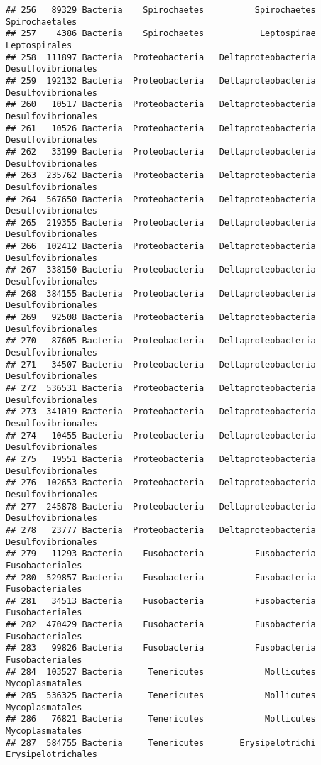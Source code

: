 \documentclass[
]{article}
\begin{document}
\begin{verbatim}
## 256   89329 Bacteria    Spirochaetes          Spirochaetes      Spirochaetales
## 257    4386 Bacteria    Spirochaetes           Leptospirae       Leptospirales
## 258  111897 Bacteria  Proteobacteria   Deltaproteobacteria  Desulfovibrionales
## 259  192132 Bacteria  Proteobacteria   Deltaproteobacteria  Desulfovibrionales
## 260   10517 Bacteria  Proteobacteria   Deltaproteobacteria  Desulfovibrionales
## 261   10526 Bacteria  Proteobacteria   Deltaproteobacteria  Desulfovibrionales
## 262   33199 Bacteria  Proteobacteria   Deltaproteobacteria  Desulfovibrionales
## 263  235762 Bacteria  Proteobacteria   Deltaproteobacteria  Desulfovibrionales
## 264  567650 Bacteria  Proteobacteria   Deltaproteobacteria  Desulfovibrionales
## 265  219355 Bacteria  Proteobacteria   Deltaproteobacteria  Desulfovibrionales
## 266  102412 Bacteria  Proteobacteria   Deltaproteobacteria  Desulfovibrionales
## 267  338150 Bacteria  Proteobacteria   Deltaproteobacteria  Desulfovibrionales
## 268  384155 Bacteria  Proteobacteria   Deltaproteobacteria  Desulfovibrionales
## 269   92508 Bacteria  Proteobacteria   Deltaproteobacteria  Desulfovibrionales
## 270   87605 Bacteria  Proteobacteria   Deltaproteobacteria  Desulfovibrionales
## 271   34507 Bacteria  Proteobacteria   Deltaproteobacteria  Desulfovibrionales
## 272  536531 Bacteria  Proteobacteria   Deltaproteobacteria  Desulfovibrionales
## 273  341019 Bacteria  Proteobacteria   Deltaproteobacteria  Desulfovibrionales
## 274   10455 Bacteria  Proteobacteria   Deltaproteobacteria  Desulfovibrionales
## 275   19551 Bacteria  Proteobacteria   Deltaproteobacteria  Desulfovibrionales
## 276  102653 Bacteria  Proteobacteria   Deltaproteobacteria  Desulfovibrionales
## 277  245878 Bacteria  Proteobacteria   Deltaproteobacteria  Desulfovibrionales
## 278   23777 Bacteria  Proteobacteria   Deltaproteobacteria  Desulfovibrionales
## 279   11293 Bacteria    Fusobacteria          Fusobacteria     Fusobacteriales
## 280  529857 Bacteria    Fusobacteria          Fusobacteria     Fusobacteriales
## 281   34513 Bacteria    Fusobacteria          Fusobacteria     Fusobacteriales
## 282  470429 Bacteria    Fusobacteria          Fusobacteria     Fusobacteriales
## 283   99826 Bacteria    Fusobacteria          Fusobacteria     Fusobacteriales
## 284  103527 Bacteria     Tenericutes            Mollicutes     Mycoplasmatales
## 285  536325 Bacteria     Tenericutes            Mollicutes     Mycoplasmatales
## 286   76821 Bacteria     Tenericutes            Mollicutes     Mycoplasmatales
## 287  584755 Bacteria     Tenericutes       Erysipelotrichi  Erysipelotrichales

\end{verbatim}
\end{document}
